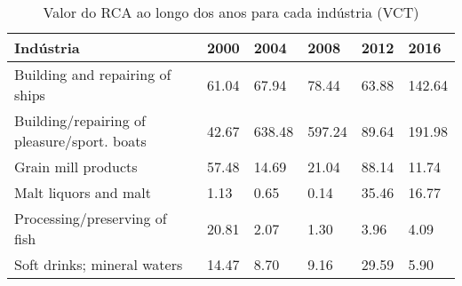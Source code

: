 \begin{table}
\centering
\caption{Valor do RCA ao longo dos anos para cada indústria (VCT)}
\begin{tabular}{p{6cm}p{1.5cm}p{1.5cm}p{1.5cm}p{1.5cm}p{1.5cm}}
\toprule
                                  Indústria &  2000 &   2004 &   2008 &  2012 &   2016 \\
\midrule
            Building and repairing of ships & 61.04 &  67.94 &  78.44 & 63.88 & 142.64 \\
Building/repairing of pleasure/sport. boats & 42.67 & 638.48 & 597.24 & 89.64 & 191.98 \\
                        Grain mill products & 57.48 &  14.69 &  21.04 & 88.14 &  11.74 \\
                      Malt liquors and malt &  1.13 &   0.65 &   0.14 & 35.46 &  16.77 \\
              Processing/preserving of fish & 20.81 &   2.07 &   1.30 &  3.96 &   4.09 \\
                Soft drinks; mineral waters & 14.47 &   8.70 &   9.16 & 29.59 &   5.90 \\
\bottomrule
\end{tabular}
\end{table}

